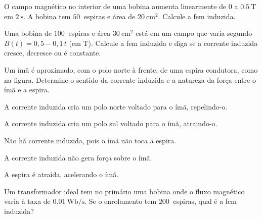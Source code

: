 \blocoaplicacao
\begin{questao}[2]{}

O campo magnético no interior de uma bobina aumenta linearmente de $0$ a
$\SI{0.5}{\tesla}$ em $\SI{2}{\second}$. A bobina tem $\SI{50}{}$ espiras e área de
$\SI{20}{\centi\meter\squared}$. Calcule a fem induzida.


\end{questao}
\begin{questao}[2]{}

Uma bobina de $\SI{100}{}$ espiras e área $\SI{30}{\centi\meter\squared}$ está em
um campo que varia segundo $B(t) = 0{,}5 - 0{,}1\,t$ (em T). Calcule a fem induzida
e diga se a corrente induzida cresce, decresce ou é constante.


\end{questao}
\begin{questao}[2]{}

Um ímã é aproximado, com o polo norte à frente, de uma espira condutora, como na
figura. Determine o sentido da corrente induzida e a natureza da força entre o
ímã e a espira.


\begin{alternativas}
\item A corrente induzida cria um polo norte voltado para o ímã, repelindo-o.
\item A corrente induzida cria um polo sul voltado para o ímã, atraindo-o.
\item Não há corrente induzida, pois o ímã não toca a espira.
\item A corrente induzida não gera força sobre o ímã.
\item A espira é atraída, acelerando o ímã.
\end{alternativas}


\end{questao}
\begin{questao}[2]{}

Um transformador ideal tem no primário uma bobina onde o fluxo magnético varia à
taxa de $\SI{0.01}{\weber\per\second}$. Se o enrolamento tem $\SI{200}{}$ espiras,
qual é a fem induzida?


\end{questao}

